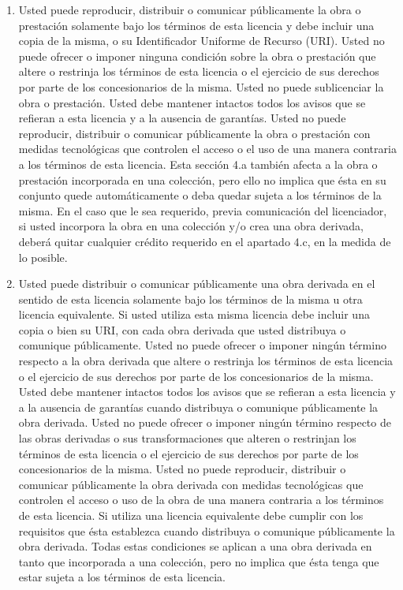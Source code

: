         \begin{enumerate}
          \item Usted puede reproducir, distribuir o comunicar públicamente la obra o prestación solamente bajo los términos de esta licencia y debe incluir una copia de la misma, o su Identificador Uniforme de Recurso (URI). Usted no puede ofrecer o imponer ninguna condición sobre la obra o prestación que altere o restrinja los términos de esta licencia o el ejercicio de sus derechos por parte de los concesionarios de la misma. Usted no puede sublicenciar la obra o prestación. Usted debe mantener intactos todos los avisos que se refieran a esta licencia y a la ausencia de garantías. Usted no puede reproducir, distribuir o comunicar públicamente la obra o prestación  con medidas tecnológicas que controlen el acceso o el uso de una manera contraria a los términos de esta licencia. Esta sección 4.a también afecta a la obra o prestación incorporada en una colección, pero ello no implica que ésta en su conjunto quede automáticamente o deba quedar sujeta a los términos de la misma. En el caso que le sea requerido, previa comunicación del licenciador, si usted incorpora la obra en una colección y/o crea una obra derivada, deberá quitar cualquier crédito requerido en el apartado 4.c,  en la medida de lo posible.

	\item Usted puede distribuir o comunicar públicamente una obra derivada en el sentido de esta licencia solamente bajo los términos de la misma u otra licencia equivalente. Si usted utiliza esta misma licencia debe incluir una copia o bien su URI, con cada obra derivada que usted distribuya o comunique públicamente. Usted no puede ofrecer o imponer ningún término respecto a la obra derivada que altere o restrinja los términos de esta licencia o el ejercicio de sus derechos por parte de los concesionarios de la misma. Usted debe mantener intactos todos los avisos que se refieran a esta licencia y a la ausencia de garantías cuando distribuya o comunique públicamente la obra derivada. Usted no puede ofrecer o imponer ningún término respecto de las obras derivadas o sus transformaciones que alteren o restrinjan los términos de esta licencia o el ejercicio de sus derechos por parte de los concesionarios de la misma. Usted no puede reproducir, distribuir o comunicar públicamente la obra derivada con medidas tecnológicas que controlen el acceso o uso de la obra de una manera contraria a los términos de esta licencia. Si utiliza una licencia equivalente debe cumplir con los requisitos que ésta establezca cuando distribuya o comunique públicamente la obra derivada. Todas estas condiciones se aplican a una obra derivada en tanto que incorporada a una colección, pero no implica que ésta tenga que estar sujeta a los términos de esta licencia.


\end{enumerate}
